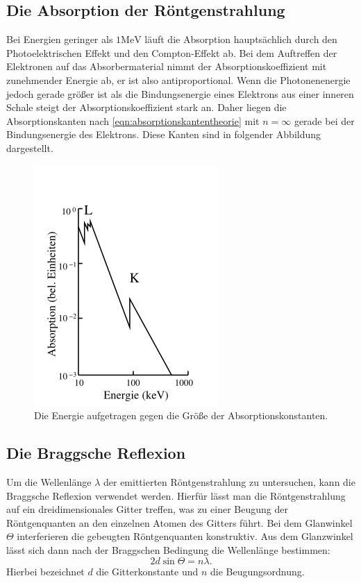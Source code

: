 \subsection{Die Absorption der Röntgenstrahlung}
Bei Energien geringer als $1 \si{\mega\electronvolt}$ läuft die Absorption
hauptsächlich durch den Photoelektrischen Effekt und den Compton-Effekt ab.
Bei dem Auftreffen der Elektronen auf das Absorbermaterial nimmt der
Absorptionskoeffizient mit zunehmender Energie ab, er ist also antiproportional.
Wenn die Photonenenergie jedoch gerade größer ist als die Bindungsenergie eines
Elektrons aus einer inneren Schale steigt der Absorptionskoeffizient stark an.
Daher liegen die Absorptionskanten nach \eqref{eqn:absorptionskantentheorie} mit
$n = \infty$ gerade bei der Bindungsenergie des Elektrons. Diese Kanten sind in
folgender Abbildung dargestellt.
\begin{figure}[H]
  \centering
  \includegraphics[scale=0.5]{"content/absorptionskanten.png"}
  \caption{Die Energie aufgetragen gegen die Größe der Absorptionskonstanten.}
  \label{fig:absorptionskanten}
\end{figure}
\noindent

\subsection{Die Braggsche Reflexion}
Um die Wellenlänge $\lambda$ der emittierten Röntgenstrahlung zu untersuchen,
kann die Braggsche Reflexion verwendet werden. Hierfür lässt man die Röntgenstrahlung
auf ein dreidimensionales Gitter treffen, was zu einer Beugung der Röntgenquanten
an den einzelnen Atomen des Gitters führt.  Bei dem Glanwinkel $\Theta$ interferieren
die gebeugten Röntgenquanten konstruktiv. Aus dem Glanzwinkel lässt sich dann
nach der Braggschen Bedingung die Wellenlänge bestimmen:
\begin{equation}
  2 d \sin \Theta = n \lambda.
  \label{eqn:braggtheorie}
\end{equation}
Hierbei bezeichnet $d$ die Gitterkonstante und $n$ die Beugungsordnung.
